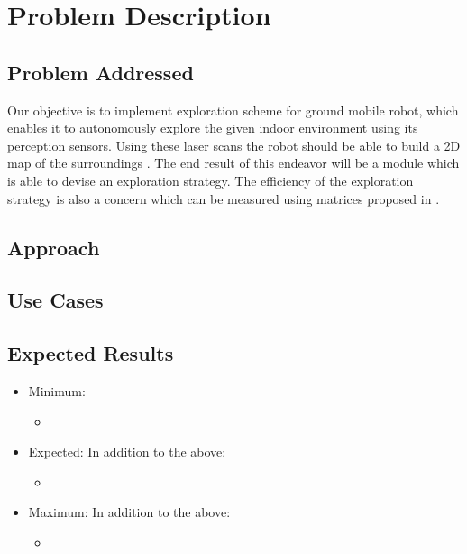 \section{Problem Description}

\subsection{Problem Addressed}
Our objective is to implement exploration scheme for ground mobile robot, which enables it to
autonomously explore the given indoor environment using its perception sensors.
Using these laser scans the robot should be able to build a 2D map of the surroundings .
The end result of this endeavor will be a module which is able to devise an exploration strategy.
The efficiency of the exploration strategy is also a concern which can be measured using matrices
proposed in \cite{Juliae2012}. \par



\subsection{Approach}


\subsection{Use Cases}

\subsection{Expected Results}
\begin{itemize}
	\item Minimum:
	\begin{itemize}
		\item
	\end{itemize}
	\item Expected:
	In addition to the above:
	\begin{itemize}
		\item
	\end{itemize}
	\item Maximum:
	In addition to the above:
	\begin{itemize}
		\item
	\end{itemize}
\end{itemize}
